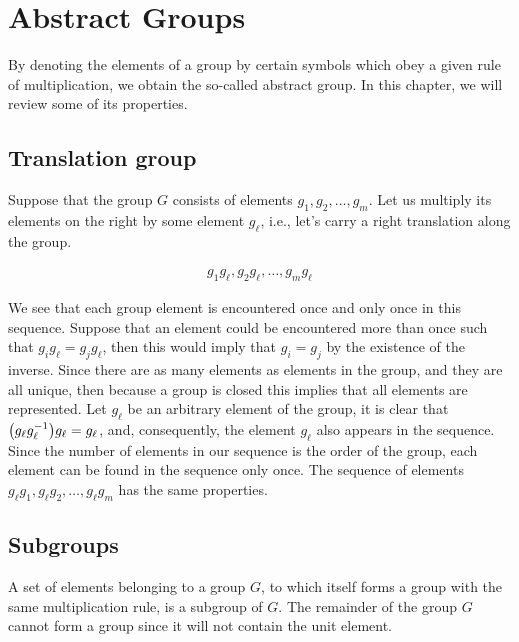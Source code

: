 \section{Abstract Groups}

By denoting the elements of a group by certain symbols which obey a given rule
of multiplication, we obtain the so-called abstract group. In this chapter, we
will review some of its properties.

\subsection{Translation group} %
\label{sub:Translation group}

Suppose that the group $G$ consists of elements $g_1,g_2,\dots,g_m$. Let us
multiply its elements on the right by some element $g_\ell$, i.e., let's carry
a right translation along the group.

\begin{align}
    g_1g_\ell,g_2g_\ell,\dots,g_mg_\ell
\end{align}

We see that each group element is encountered once and only once in this sequence.
Suppose that an element could be encountered more than once such that $g_ig_\ell=
g_jg_\ell$, then this would imply that $g_i=g_j$ by the existence of the inverse.
Since there are as many elements as elements in the group, and they are all
unique, then because a group is closed this implies that all elements are
represented.
Let $g_\ell$ be an arbitrary element of the group, it is clear that
$\qty(g_\ell g^{-1}_\ell)g_\ell=g_\ell$, and, consequently, the element $g_\ell$
also appears in the sequence. Since the number of elements in our sequence is the
order of the group, each element can be found in the sequence only once. The
sequence of elements $g_\ell g_1,g_\ell g_2,\dots,g_\ell g_m$ has the same
properties.


\subsection{Subgroups} %
\label{sub:Sub-groups}

A set of elements belonging to a group $G$, to which itself forms a group with
the same multiplication rule, is a subgroup of $G$. The remainder of the group
$G$ cannot form a group since it will not contain the unit element.

